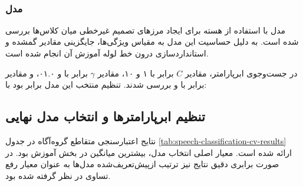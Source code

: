 \documentclass[12pt,a4paper,oneside]{report}
\begin{document}
\begin{center}
\\
\end{center}


\subsubsection{مدل }

مدل  با استفاده از هسته  برای
ایجاد مرزهای تصمیم غیرخطی میان کلاس‌ها بررسی شده است. به دلیل حساسیت این
مدل به مقیاس ویژگی‌ها، جایگزینی مقادیر گمشده و استانداردسازی درون خط لوله
آموزش آن انجام شده است.

در جست‌وجوی ابرپارامتر، مقادیر $C$ برابر با ۱ و ۱۰، مقادیر
$\gamma$ برابر با  و ۰۱.۰، و مقادیر
 برابر با  و
 بررسی شدند. تنظیم منتخب این مدل برابر بود با:

\begin{center}
\end{center}


\subsection{تنظیم ابرپارامترها و انتخاب مدل نهایی}

نتایج اعتبارسنجی متقاطع گروه‌آگاه در جدول
\ref{tab:speech-classification-cv-results}
ارائه شده است. معیار اصلی انتخاب مدل، بیشترین میانگین  در
بخش آموزش بود. در صورت برابری دقیق نتایج نیز ترتیب ازپیش‌تعریف‌شده مدل‌ها
به عنوان معیار رفع تساوی در نظر گرفته شده بود.
\end{document}
